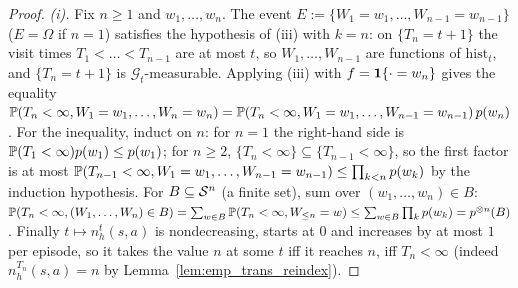 \begin{proof}
\emph{(i).} Fix $n \ge 1$ and $w_1, \dots, w_n$. The event $E := \{W_1 = w_1, \dots, W_{n-1} = w_{n-1}\}$
($E = \Omega$ if $n = 1$) satisfies the hypothesis of (iii) with $k = n$: on $\{T_n = t + 1\}$
the visit times $T_1 < \dots < T_{n-1}$ are at most $t$, so $W_1, \dots, W_{n-1}$ are functions
of $\mathrm{hist}_t$, and $\{T_n = t+1\}$ is $\mathcal G_t$-measurable. Applying (iii) with
$f = \mathbf{1}\{\cdot = w_n\}$ gives the equality
$\mathbb{P}(T_n < \infty, W_1 = w_1, \dots, W_n = w_n) = \mathbb{P}(T_n < \infty, W_1 = w_1, \dots, W_{n-1} = w_{n-1})\,p(w_n)$.
For the inequality, induct on $n$: for $n = 1$ the right-hand side is $\mathbb{P}(T_1 < \infty)p(w_1) \le p(w_1)$;
for $n \ge 2$, $\{T_n < \infty\} \subseteq \{T_{n-1} < \infty\}$, so the first factor is at most
$\mathbb{P}(T_{n-1} < \infty, W_1 = w_1, \dots, W_{n-1} = w_{n-1}) \le \prod_{k < n} p(w_k)$ by the
induction hypothesis. For $B \subseteq \mathcal{S}^n$ (a finite set), sum over $(w_1,\dots,w_n) \in B$:
$\mathbb{P}(T_n < \infty, (W_1,\dots,W_n) \in B) = \sum_{w \in B}\mathbb{P}(T_n < \infty, W_{\le n} = w) \le \sum_{w \in B}\prod_k p(w_k) = p^{\otimes n}(B)$.
Finally $t \mapsto n^t_h(s,a)$ is nondecreasing, starts at $0$ and increases by at most $1$ per
episode, so it takes the value $n$ at some $t$ iff it reaches $n$, iff $T_n < \infty$
(indeed $n^{T_n}_h(s,a) = n$ by Lemma~\ref{lem:emp_trans_reindex}).
\end{proof}

